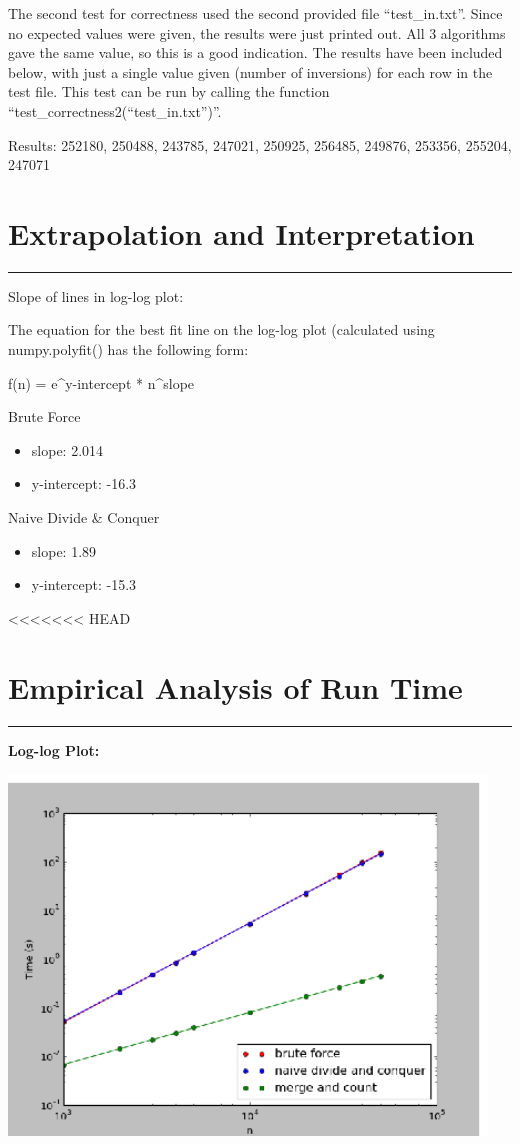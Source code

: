 \documentclass[letterpaper,10pt,titlepage,fleqn]{article}
\begin{document}
The second test for correctness used the second provided file ``test\_in.txt''. Since no expected values were given, the results were just printed out. All 3 algorithms gave the same value, so this is a good indication. The results have been included below, with just a single value given (number of inversions) for each row in the test file. This test can be run by calling the function ``test\_correctness2(``test\_in.txt'')''.

Results:
252180, 250488, 243785, 247021, 250925, 256485, 249876, 253356, 255204, 247071

\section*{Extrapolation and Interpretation}
\hrule

Slope of lines in log-log plot:

The equation for the best fit line on the log-log plot (calculated using numpy.polyfit() has the following form:

f(n) = e^y-intercept * n^slope

Brute Force
\begin{itemize}
\item slope: 2.014
\item y-intercept: -16.3
\end{itemize}

Naive Divide & Conquer
\begin{itemize}
\item slope: 1.89
\item y-intercept: -15.3
\end{itemize}

<<<<<<< HEAD
\section*{Empirical Analysis of Run Time}
\hrule

\textbf{Log-log Plot:}
\vskip 0.04in
\begin{center}
  \includegraphics[width=5in]{loglog.ps}
\end{center}
\end{document}
